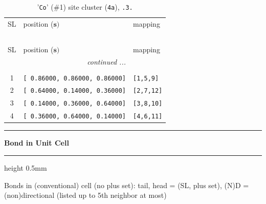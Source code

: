 \documentclass[fleqn,10pt,landscape]{jsarticle}
\begin{document}
\renewcommand{\arraystretch}{1.6}
\begin{longtable}[l]{cll}
\captionsetup{justification=raggedright, singlelinecheck=off}
\caption{'\texttt{Co}' (\#1) site cluster (\texttt{4a}), \texttt{.3.}}
 \\
 \hline \hline
SL & position ($\bm{s})$ & mapping \\ \hline \endfirsthead

\multicolumn{2}{l}{\tablename\ \thetable{}} \\
 \hline \hline
SL & position ($\bm{s})$ & mapping \\ \hline \endhead

 \hline \hline
\multicolumn{2}{r}{\footnotesize\it continued ...} \\ \endfoot

 \hline \hline
\multicolumn{2}{r}{} \\ \endlastfoot

1 & \texttt{[ 0.86000, 0.86000, 0.86000]} & \texttt{[1,5,9]} \\ \hline
2 & \texttt{[ 0.64000, 0.14000, 0.36000]} & \texttt{[2,7,12]} \\ \hline
3 & \texttt{[ 0.14000, 0.36000, 0.64000]} & \texttt{[3,8,10]} \\ \hline
4 & \texttt{[ 0.36000, 0.64000, 0.14000]} & \texttt{[4,6,11]} \\
\end{longtable}
\vspace{5mm}
\noindent \rule[0.5mm]{5mm}{0.5mm}\hspace{3mm}\textbf{Bond in Unit Cell}\hspace{3mm}\leaders\hrule height 0.5mm\hfill\kern0pt
\vspace{3mm}

\noindent Bonds in (conventional) cell (no plus set): tail, head = (SL, plus set), (N)D = (non)directional (listed up to 5th neighbor at most)
\end{document}
